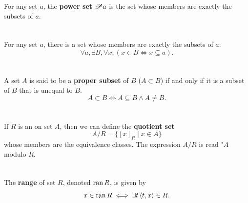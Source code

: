 \documentclass{report}
\begin{document}
  For any set $a$, the \textbf{power set $\mathscr{P}a$} is the set whose
    members are exactly the subsets of $a$.


\section{}%

  For any set $a$, there is a set whose members are exactly the subsets of $a$:
    $$\forall a, \exists B, \forall x, (x \in B \iff x \subseteq a).$$


\section{}%

  A set $A$ is said to be a \textbf{proper subset} of $B$ ($A \subset B$) if and
    only if it is a subset of $B$ that is unequal to $B$.
  $$A \subset B \iff A \subseteq B \land A \neq B.$$


\section{}%

  If $R$ is an  on set $A$, then we can define
    the \textbf{quotient set} $$A / R = \{[x]_R \mid x \in A\}$$ whose members
    are the equivalence classes.
  The expression $A / R$ is read "$A$ modulo $R$.


\section{}%

  The \textbf{range} of set $R$, denoted $\mathop{\text{ran}}{R}$, is given by
    $$x \in \mathop{\text{ran}}{R} \iff \exists t \left< t, x \right> \in R.$$



\section{}%
\end{document}
